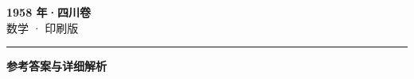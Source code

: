 \documentclass[zihao=5, a4paper]{ctexart}
\begin{document}
\begin{center}
  {\Large\bfseries 1958 年·四川卷}\\[4pt]
  {\large 数学 · 印刷版}
\end{center}
\medskip
{}

\par\bigskip\hrule\bigskip
{}
\begin{center}{\large\bfseries 参考答案与详细解析}\end{center}
\smallskip

\end{document}
